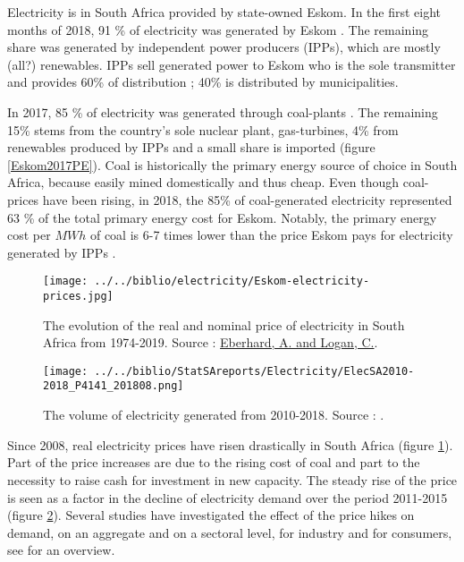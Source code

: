 \documentclass[12pt,english]{article}
\begin{document}
Electricity is in South Africa provided by state-owned Eskom. In the first eight months of 2018, 91 \% of electricity was generated by Eskom \citep{P4141_201808}. The remaining share was generated by independent power producers (IPPs), which are mostly (all?) renewables. IPPs sell generated power to Eskom who is the sole transmitter and provides 60\% of distribution ; 40\% is distributed by municipalities.

In 2017, 85 \% of electricity was generated through coal-plants \citep{Eskom2017AR}. The remaining 15\% stems from the country's sole nuclear plant, gas-turbines, 4\% from renewables produced by IPPs and a small share is imported (figure \ref{Eskom2017PE}). Coal is historically the primary energy source of choice in South Africa, because easily mined domestically and thus cheap. Even though coal-prices have been rising, in 2018, the 85\% of coal-generated electricity represented 63 \% of the total primary energy cost for Eskom. Notably, the primary energy cost per $MWh$ of coal is 6-7 times lower than the price Eskom pays for electricity generated by IPPs \citep{Eskom2017AR}.  

\begin{figure}[!t]
	\centering
	\texttt{[image: ../../biblio/electricity/Eskom-electricity-prices.jpg]}
	\caption{\label{Eskom-electricity-prices} The evolution of the real and nominal price of electricity in South Africa from 1974-2019. Source : \href{https://mybroadband.co.za/news/business/68724-how-lecturers-tore-eskoms-tariff-case-apart-in-25-minutes.html}{Eberhard, A. and Logan, C.}.}
\end{figure}


\begin{figure}[!t]
	\centering
	\texttt{[image: ../../biblio/StatSAreports/Electricity/ElecSA2010-2018\_P4141\_201808.png]}
	\caption{\label{Elecvolume_2010_2018}The volume of electricity generated from 2010-2018. Source : \citep{P4141_201808}.}
\end{figure}

Since 2008, real electricity prices have risen drastically in South Africa (figure \ref{Eskom-electricity-prices}). Part of the price increases are due to the rising cost of coal and part to the necessity to raise cash for investment in new capacity. The steady rise of the price is seen as a factor in the decline of electricity demand over the period 2011-2015 (figure \ref{Elecvolume_2010_2018}). Several studies have investigated the effect of the price hikes on demand, on an aggregate and on a sectoral level, for industry and for consumers, see \cite{goliger2018electricity} for an overview.
\end{document}
